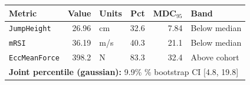 \begin{tabular}{lrlrrl}
\toprule
Metric & Value & Units & Pct & MDC$_{95}$ & Band \\
\midrule
\texttt{JumpHeight} & 26.96 & cm & 32.6 & 7.84 & Below median \\
\texttt{mRSI} & 36.19 & m/s & 40.3 & 21.1 & Below median \\
\texttt{EccMeanForce} & 398.2 & N & 83.3 & 32.4 & Above cohort \\
\midrule
\multicolumn{6}{l}{\textbf{Joint percentile (gaussian):} 9.9\% \quad 95\% bootstrap CI [4.8, 19.8]} \\
\bottomrule
\end{tabular}
